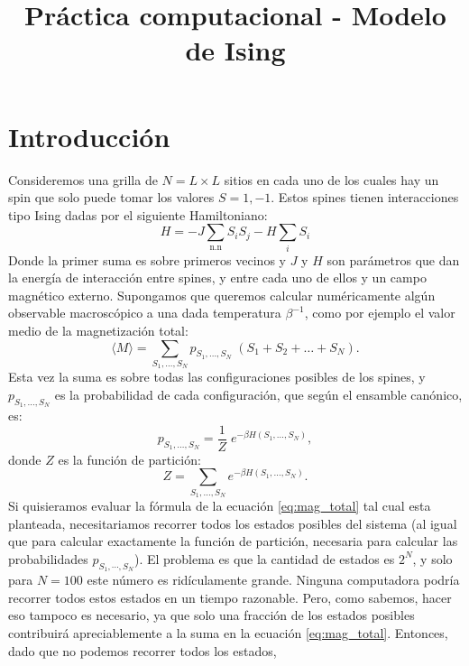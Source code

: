 \documentclass[a4paper,11pt,oneside]{article}
\title{Práctica computacional - Modelo de Ising}
\author{}
\date{}
\newcommand{\mean}[1]{\langle #1 \rangle}
\begin{document}
\maketitle

\section{Introducción}

Consideremos una grilla de $N = L\times L$ sitios en cada uno de los cuales hay
un spin que solo puede tomar los valores $S = 1,-1$. Estos
spines tienen interacciones tipo Ising dadas por el siguiente Hamiltoniano:
\begin{equation}
    H = -J\sum_\text{n.n} S_i S_j - H \sum_i S_i
\end{equation}
Donde la primer suma es sobre primeros vecinos y $J$ y $H$ son parámetros que
dan la energía de interacción entre spines, y entre cada uno de ellos y un
campo magnético externo. Supongamos que queremos calcular numéricamente algún
observable macroscópico a una dada temperatura $\beta^{-1}$, como por ejemplo
el valor medio de la magnetización total:
\begin{equation}
    \mean{M} = \sum_{S_1,\dots,S_N} p_{S_1,\dots,S_N} \; (S_1+S_2+\dots+S_N).
    \label{eq:mag_total}
\end{equation}
Esta vez la suma es sobre todas las configuraciones posibles de los spines, y
$p_{S_1,\dots,S_N}$ es la probabilidad de cada configuración, que según el
ensamble canónico, es:
\begin{equation}
    p_{S_1,\dots,S_N} = \frac{1}{Z} \; e^{-\beta H(S_1,\dots,S_N)},
\end{equation}
donde $Z$ es la función de partición:
\begin{equation}
    Z = \sum_{S_1,\dots,S_N} e^{-\beta H(S_1,\dots,S_N)}.
\end{equation}
Si quisieramos evaluar la fórmula de la ecuación \ref{eq:mag_total} tal cual esta planteada,
necesitariamos recorrer todos los estados posibles del sistema (al igual que
para calcular exactamente la función de partición, necesaria para calcular las
probabilidades $p_{S_1,\cdots,S_N}$). El problema es que la cantidad de estados
es $2^{N}$, y solo para $N=100$ este número es ridículamente grande. Ninguna
computadora podría recorrer todos estos estados en un tiempo razonable. Pero,
como sabemos, hacer eso tampoco es necesario, ya que solo una fracción de los
estados posibles contribuirá apreciablemente a la suma en la ecuación
\ref{eq:mag_total}. Entonces, dado que no podemos recorrer todos los estados,
\end{document}
